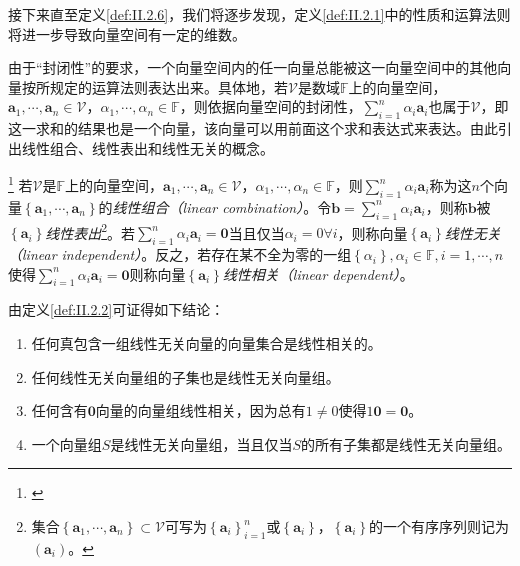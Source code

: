 \documentclass[../main.tex]{subfiles}
\begin{document}
接下来直至定义\ref{def:II.2.6}，我们将逐步发现，定义\ref{def:II.2.1}中的性质和运算法则将进一步导致向量空间有一定的维数。

由于“封闭性”的要求，一个向量空间内的任一向量总能被这一向量空间中的其他向量按所规定的运算法则表达出来。具体地，若$\mathcal{V}$是数域$\mathbb{F}$上的向量空间，$\mathbf{a}_1,\cdots,\mathbf{a}_n\in\mathcal{V}$，$\alpha_1,\cdots,\alpha_n\in\mathbb{F}$，则依据向量空间的封闭性，$\sum_{i=1}^n\alpha_i\mathbf{a}_i$也属于$\mathcal{V}$，即这一求和的结果也是一个向量，该向量可以用前面这个求和表达式来表达。由此引出线性组合、线性表出和线性无关的概念。

\begin{definition}\label{def:II.2.2}\footnote{\cite[\S 7.2定义2.2、2.3]{周胜林2012线性代数}}
    若$\mathcal{V}$是$\mathbb{F}$上的向量空间，$\mathbf{a}_1,\cdots,\mathbf{a}_n\in\mathcal{V}$，$\alpha_1,\cdots,\alpha_n\in\mathbb{F}$，则$\sum_{i=1}^n\alpha_i\mathbf{a}_i$称为这$n$个向量$\left\{\mathbf{a}_1,\cdots,\mathbf{a}_n\right\}$的\emph{线性组合（linear combination）}。令$\mathbf{b}=\sum_{i=1}^n\alpha_i\mathbf{a}_i$，则称$\mathbf{b}$被$\left\{\mathbf{a}_i\right\}$\emph{线性表出}\footnote{集合$\left\{\mathbf{a}_1,\cdots,\mathbf{a}_n\right\}\subset\mathcal{V}$可写为$\left\{\mathbf{a}_i\right\}_{i=1}^n$或$\left\{\mathbf{a}_i\right\}$，$\left\{\mathbf{a}_i\right\}$的一个有序序列则记为$\left(\mathbf{a}_i\right)$。}。若$\sum_{i=1}^n\alpha_i\mathbf{a}_i=\mathbf{0}$当且仅当$\alpha_i=0\forall i$，则称向量$\left\{\mathbf{a}_i\right\}$\emph{线性无关（linear independent）}。反之，若存在某不全为零的一组$\left\{\alpha_i\right\},\alpha_i\in\mathbb{F},i=1,\cdots,n$使得$\sum_{i=1}^n\alpha_i\mathbf{a}_i=\mathbf{0}$则称向量$\left\{\mathbf{a}_i\right\}$\emph{线性相关（linear dependent）}。
\end{definition}

由定义\ref{def:II.2.2}可证得如下结论\cite[\S 7.2定义2.3下的“常用结果”]{周胜林2012线性代数}：
\begin{enumerate}
    \item 任何真包含一组线性无关向量的向量集合是线性相关的。
    \item 任何线性无关向量组的子集也是线性无关向量组。
    \item 任何含有$\mathbf{0}$向量的向量组线性相关，因为总有$1\neq 0$使得$1\mathbf{0}=\mathbf{0}$。
    \item 一个向量组$S$是线性无关向量组，当且仅当$S$的所有子集都是线性无关向量组。
\end{enumerate}
\end{document}

